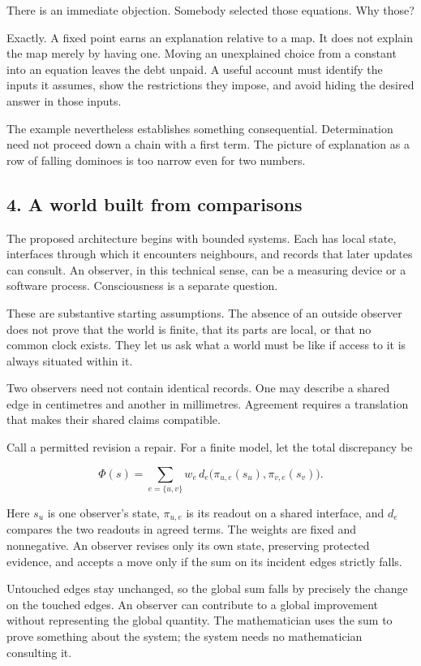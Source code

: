 \documentclass[
  11pt,
]{article}
\begin{document}
There is an immediate objection. Somebody selected those equations. Why
those?

Exactly. A fixed point earns an explanation relative to a map. It does
not explain the map merely by having one. Moving an unexplained choice
from a constant into an equation leaves the debt unpaid. A useful
account must identify the inputs it assumes, show the restrictions they
impose, and avoid hiding the desired answer in those inputs.

The example nevertheless establishes something consequential.
Determination need not proceed down a chain with a first term. The
picture of explanation as a row of falling dominoes is too narrow even
for two numbers.

\subsection{4. A world built from
comparisons}\label{a-world-built-from-comparisons}

The proposed architecture begins with bounded systems. Each has local
state, interfaces through which it encounters neighbours, and records
that later updates can consult. An observer, in this technical sense,
can be a measuring device or a software process. Consciousness is a
separate question.

These are substantive starting assumptions. The absence of an outside
observer does not prove that the world is finite, that its parts are
local, or that no common clock exists. They let us ask what a world must
be like if access to it is always situated within it.

Two observers need not contain identical records. One may describe a
shared edge in centimetres and another in millimetres. Agreement
requires a translation that makes their shared claims compatible.

Call a permitted revision a repair. For a finite model, let the total
discrepancy be

\[
  \Phi(s)=\sum_{e=\{u,v\}}w_e\,
  d_e\bigl(\pi_{u,e}(s_u),\pi_{v,e}(s_v)\bigr).
\]

Here \(s_u\) is one observer's state, \(\pi_{u,e}\) is its readout on a
shared interface, and \(d_e\) compares the two readouts in agreed terms.
The weights are fixed and nonnegative. An observer revises only its own
state, preserving protected evidence, and accepts a move only if the sum
on its incident edges strictly falls.

Untouched edges stay unchanged, so the global sum falls by precisely the
change on the touched edges. An observer can contribute to a global
improvement without representing the global quantity. The mathematician
uses the sum to prove something about the system; the system needs no
mathematician consulting it.
\end{document}
